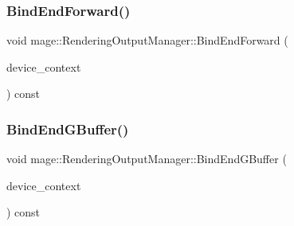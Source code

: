 \hypertarget{classmage_1_1_rendering_output_manager_ac9fc0758bcd83db7ae24641d4fd38273}{}\label{classmage_1_1_rendering_output_manager_ac9fc0758bcd83db7ae24641d4fd38273} 
\subsubsection{\texorpdfstring{Bind\+End\+Forward()}{BindEndForward()}}
{\footnotesize\ttfamily void mage\+::\+Rendering\+Output\+Manager\+::\+Bind\+End\+Forward (\begin{DoxyParamCaption}\item[{I\+D3\+D11\+Device\+Context4 $\ast$}]{device\+\_\+context }\end{DoxyParamCaption}) const\hspace{0.3cm}{\ttfamily [noexcept]}}

\hypertarget{classmage_1_1_rendering_output_manager_a40e30533e1145586469121117c15b42a}{}\label{classmage_1_1_rendering_output_manager_a40e30533e1145586469121117c15b42a} 
\subsubsection{\texorpdfstring{Bind\+End\+G\+Buffer()}{BindEndGBuffer()}}
{\footnotesize\ttfamily void mage\+::\+Rendering\+Output\+Manager\+::\+Bind\+End\+G\+Buffer (\begin{DoxyParamCaption}\item[{I\+D3\+D11\+Device\+Context4 $\ast$}]{device\+\_\+context }\end{DoxyParamCaption}) const\hspace{0.3cm}{\ttfamily [noexcept]}}

\hypertarget{classmage_1_1_rendering_output_manager_a406c918e63032968a5c82f7ae7d39606}{}\label{classmage_1_1_rendering_output_manager_a406c918e63032968a5c82f7ae7d39606} 
